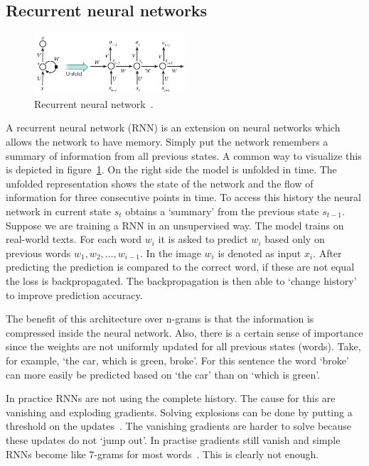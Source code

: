 \subsection{Recurrent neural networks}
\label{subsec:rnn}
\begin{figure}[htbp]
    \begin{center}
        \includegraphics[width=0.5\textwidth]{figures/rnn.jpg}
    \end{center}
    \caption{Recurrent neural network~\cite[Figure 5]{lecun2015deep}.}
    \label{fig:rnn}
\end{figure}
A recurrent neural network (RNN) is an extension on neural networks which allows the network to have memory.
Simply put the network remembers a summary of information from all previous states.
A common way to visualize this is depicted in figure~\ref{fig:rnn}.
On the right side the model is unfolded in time.
The unfolded representation shows the state of the network and the flow of information for three consecutive points in time.
To access this history the neural network in current state $s_t$ obtains a `summary' from the previous state $s_{t-1}$.
Suppose we are training a RNN in an unsupervised way.
The model trains on real-world texts.
For each word $w_i$ it is asked to predict $w_i$ based only on previous words $w_1, w_2, \ldots, w_{i-1}$.
In the image $w_i$ is denoted as input $x_i$.
After predicting the prediction is compared to the correct word, if these are not equal the loss is backpropagated.
The backpropagation is then able to `change history' to improve prediction accuracy.

The benefit of this architecture over n-grams is that the information is compressed inside the neural network.
Also, there is a certain sense of importance since the weights are not uniformly updated for all previous states (words).
Take, for example, `the car, which is green, broke'.
For this sentence the word `broke' can more easily be predicted based on `the car' than on `which is green'.

In practice RNNs are not using the complete history.
The cause for this are vanishing and exploding gradients.
Solving explosions can be done by putting a threshold on the updates~\citep{mikolov2014learning}.
The vanishing gradients are harder to solve because these updates do not `jump out'.
In practise gradients still vanish and simple RNNs become like 7-grams for most words~\citep{manning2017lectures}.
This is clearly not enough.

